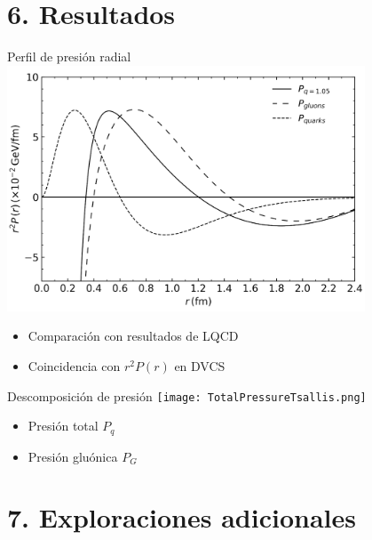 \documentclass{beamer}
\begin{document}
\section[Resultados]{6. Resultados}
\begin{frame}{Perfil de presión radial}
  \includegraphics[width=0.8\textwidth]{figures/PressureDistributionsTot-Q-G.png}
  \begin{itemize}
    \item Comparación con resultados de LQCD
    \item Coincidencia con \( r^2 P(r) \) en DVCS
  \end{itemize}
\end{frame}

\begin{frame}{Descomposición de presión}
  \texttt{[image: TotalPressureTsallis.png]}
  \begin{itemize}
    \item Presión total \( P_q \)
    \item Presión gluónica \( P_G \)
  \end{itemize}
\end{frame}
\section[Exploraciones adicionales]{7. Exploraciones adicionales}
\end{document}
